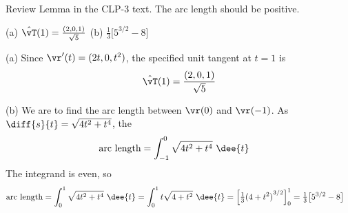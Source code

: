 \begin{hint} 
Review Lemma  in the CLP-3 text.
The arc length should be positive.
\end{hint}

\begin{answer} 
(a) $\hat\vT(1) = \frac{(2,0,1)}{\sqrt{5}}$\qquad
(b) $\frac{1}{3}\big[5^{3/2}-8\big]$
\end{answer}

\begin{solution} (a)
Since $\vr'(t) = (2t,0,t^2)$, the specified unit tangent at $t=1$ is
\begin{equation*}
\hat\vT(1) = \frac{(2,0,1)}{\sqrt{5}}
\end{equation*}

\noindent (b)
We are to find the arc length between $\vr(0)$ and $\vr(-1)$. 
As $\diff{s}{t}=\sqrt{4t^2+t^4}$, the 
\begin{align*}
\text{arc length} &= \int_{-1}^0 \sqrt{4t^2+t^4}\ \dee{t}
\end{align*}
The integrand is even, so
\begin{align*}
\text{arc length} &= \int_0^1 \sqrt{4t^2+t^4}\ \dee{t}
=\int_0^1 t\sqrt{4+t^2}\ \dee{t}
=\Big[\tfrac{1}{3}{(4+t^2)}^{3/2}\Big]_0^1
=\tfrac{1}{3}\big[5^{3/2}-8\big]
\end{align*}

\end{solution}



